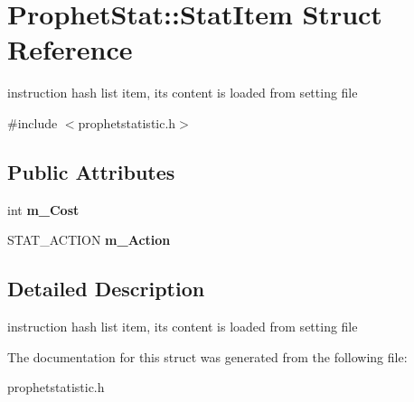 \hypertarget{structProphetStat_1_1StatItem}{
\section{ProphetStat::StatItem Struct Reference}
\label{structProphetStat_1_1StatItem}
}


instruction hash list item, its content is loaded from setting file  




{\ttfamily \#include $<$prophetstatistic.h$>$}

\subsection*{Public Attributes}
\begin{DoxyCompactItemize}
\item 
\hypertarget{structProphetStat_1_1StatItem_a5ccca91275abbbf583d84417d1334dfe}{
int {\bfseries m\_\-Cost}}
\label{structProphetStat_1_1StatItem_a5ccca91275abbbf583d84417d1334dfe}

\item 
\hypertarget{structProphetStat_1_1StatItem_aaccb4e5101e8fbe1ccbe634abc7dea8a}{
STAT\_\-ACTION {\bfseries m\_\-Action}}
\label{structProphetStat_1_1StatItem_aaccb4e5101e8fbe1ccbe634abc7dea8a}

\end{DoxyCompactItemize}


\subsection{Detailed Description}
instruction hash list item, its content is loaded from setting file 

The documentation for this struct was generated from the following file:\begin{DoxyCompactItemize}
\item 
prophetstatistic.h\end{DoxyCompactItemize}
